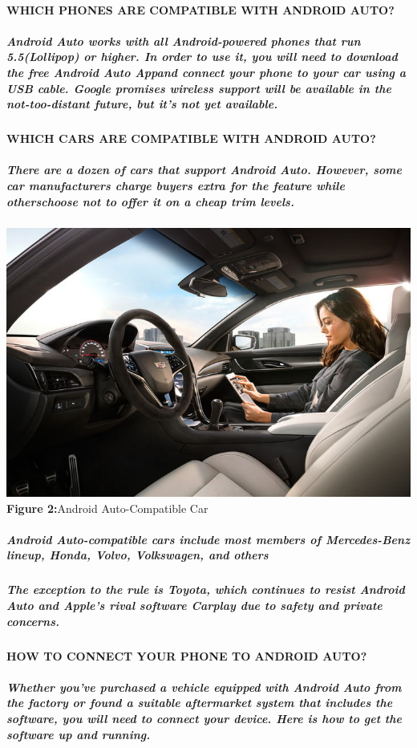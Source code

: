 \documentclass[a4paper, 12pt]{article}
\begin{document}
\paragraph{\textbf{WHICH PHONES ARE COMPATIBLE WITH ANDROID AUTO?}}
\subparagraph{Android Auto works with all Android-powered phones that run 5.5(Lollipop) or higher. In order to use it, you will need to download the free Android Auto Appand connect your phone to your car using a USB cable. Google promises wireless support will be available in the not-too-distant future, but it's not yet available.}
\paragraph{\textbf{WHICH CARS ARE COMPATIBLE WITH ANDROID AUTO?}}
\subparagraph{There are a dozen of cars that support Android Auto. However, some car manufacturers charge buyers extra for the feature while otherschoose not to offer it on a cheap trim levels.}
\includegraphics[width=\textwidth]{car}
\textbf{Figure 2:}Android Auto-Compatible Car
\subparagraph{Android Auto-compatible cars include most members of Mercedes-Benz lineup, Honda, Volvo, Volkswagen, and others}
\subparagraph{The exception to the rule is Toyota, which continues to resist Android Auto and Apple's rival software Carplay due to safety and private concerns.}
\paragraph{\textbf{HOW TO CONNECT YOUR PHONE TO ANDROID AUTO?}}
\subparagraph{Whether you've purchased a vehicle equipped with Android Auto from the factory or found a suitable aftermarket system that includes the software,  you will need to connect your device. Here is how to get the software up and running.}
\end{document}
